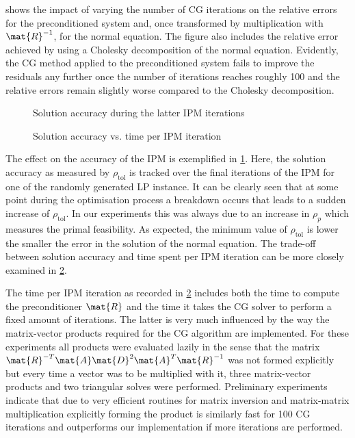  shows the impact of varying the number of CG iterations on the relative errors for the preconditioned system and, once transformed by multiplication with \(\mat{R}^{-1}\), for the normal equation.
The figure also includes the relative error achieved by using a Cholesky decomposition of the normal equation.
Evidently, the CG method applied to the preconditioned system fails to improve the residuals any further once the number of iterations reaches roughly 100 and the relative errors remain slightly worse compared to the Cholesky decomposition.

\begin{figure}[tbp]
  \centering%
  \caption{Solution accuracy during the latter IPM iterations}%
  \label{fig:accuracy_history}
\end{figure}

\begin{figure}[tbp]
  \centering%
  \caption{Solution accuracy vs. time per IPM iteration}%
  \label{fig:accuracy_vs_time}
\end{figure}

The effect on the accuracy of the IPM is exemplified in \cref{fig:accuracy_history}.
Here, the solution accuracy as measured by \(\rho_{\mathrm{tol}}\) is tracked over the final iterations of the IPM for one of the randomly generated LP instance.
It can be clearly seen that at some point during the optimisation process a breakdown occurs that leads to a sudden increase of \(\rho_{\mathrm{tol}}\).
In our experiments this was always due to an increase in \(\rho_p\) which measures the primal feasibility.
As expected, the minimum value of \(\rho_{\mathrm{tol}}\) is lower the smaller the error in the solution of the normal equation.
The trade-off between solution accuracy and time spent per IPM iteration can be more closely examined in \cref{fig:accuracy_vs_time}.

The time per IPM iteration as recorded in \cref{fig:accuracy_vs_time} includes both the time to compute the preconditioner \(\mat{R}\) and the time it takes the CG solver to perform a fixed amount of iterations.
The latter is very much influenced by the way the matrix-vector products required for the CG algorithm are implemented.
For these experiments all products were evaluated lazily in the sense that the matrix \(\mat{R}^{-T}\mat{A}\mat{D}^2\mat{A}^T\mat{R}^{-1}\) was not formed explicitly but every time a vector was to be multiplied with it, three matrix-vector products and two triangular solves were performed.
Preliminary experiments indicate that due to very efficient routines for matrix inversion and matrix-matrix multiplication explicitly forming the product is similarly fast for 100 CG iterations and outperforms our implementation if more iterations are performed.


